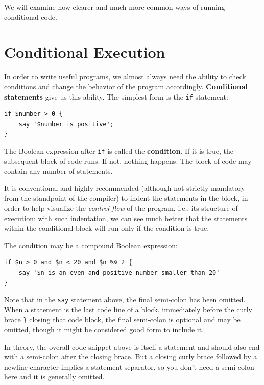 We will examine now clearer and much more common 
ways of running conditional code.


\section{Conditional Execution}
\label{conditional.execution}

In order to write useful programs, we almost always need the ability
to check conditions and change the behavior of the program
accordingly.  {\bf Conditional statements} give us this ability.  The
simplest form is the {\tt if} statement:

\begin{verbatim}
if $number > 0 {
    say '$number is positive';
}
\end{verbatim}
%
The Boolean expression after {\tt if} is called the 
{\bf condition}.  If it is true, the subsequent 
block of code runs.  If not, nothing happens. The block of 
code may contain any number of statements.

It is conventional and highly recommended (although not 
strictly mandatory from the standpoint of the compiler) 
to indent the statements in the block, in order to help 
visualize the \emph{control flow} of the program, i.e., 
its structure of execution: with such indentation, we 
can see much better that the statements within the 
conditional block will run only if the condition is true.

The condition may be a compound Boolean expression:
\begin{verbatim}
if $n > 0 and $n < 20 and $n %% 2 {
    say '$n is an even and positive number smaller than 20'
}
\end{verbatim}
%
Note that in the {\tt say} statement above, the final semi-colon 
has been omitted. When a statement is the last code line of 
a block, immediately before the curly brace {\tt \}} closing 
that code block, the final semi-colon is optional and may 
be omitted, though it might be considered good form to include it.

In theory, the overall code snippet above is itself a statement 
and should also end with a semi-colon after the closing brace. 
But a closing curly brace followed by a newline character implies a statement separator, so you don't need a semi-colon here and it is generally omitted.



